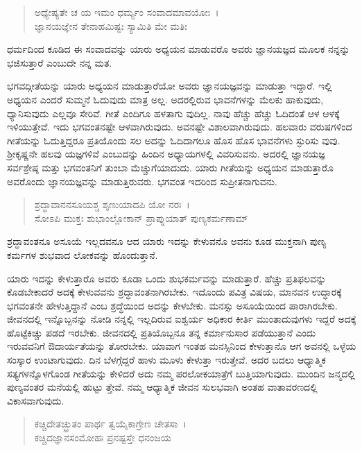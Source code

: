 \begin{verse}
ಅಧ್ಯೇಷ್ಯತೇ ಚ ಯ ಇಮಂ ಧರ್ಮ್ಯಂ ಸಂವಾದಮಾವಯೋಃ~।\\ಜ್ಞಾನಯಜ್ಞೇನ ತೇನಾಹಮಿಷ್ಟಃ ಸ್ಯಾಮಿತಿ ಮೇ ಮತಿಃ 
\end{verse}

{\small ಧರ್ಮದಿಂದ ಕೂಡಿದ ಈ ಸಂವಾದವನ್ನು ಯಾರು ಅಧ್ಯಯನ ಮಾಡುವರೊ ಅವರು ಜ್ಞಾನಯಜ್ಞದ ಮೂಲಕ ನನ್ನನ್ನು ಭಜಿಸುತ್ತಾರೆ ಎಂಬುದೇ ನನ್ನ ಮತ.}

ಭಗವದ್ಗೀತೆಯನ್ನು ಯಾರು ಅಧ್ಯಯನ ಮಾಡುತ್ತಾರೆಯೋ ಅವರು ಜ್ಞಾನಯಜ್ಞವನ್ನು ಮಾಡುತ್ತಾ ಇದ್ದಾರೆ. ಇಲ್ಲಿ ಅಧ್ಯಯನ ಎಂದರೆ ಸುಮ್ಮನೆ ಓದುವುದು ಮಾತ್ರ ಅಲ್ಲ. ಅದರಲ್ಲಿರುವ ಭಾವನೆಗಳನ್ನು ಮೆಲಕು ಹಾಕುವುದು, ಧ್ಯಾನಿಸುವುದು ಎಲ್ಲವೂ ಸೇರಿವೆ. ಗೀತೆ ಎಂದಿಗೂ ಹಳತಾಗು ವುದಿಲ್ಲ. ನಾವು ಹೆಚ್ಚು ಹೆಚ್ಚು ಓದಿದಂತೆ ಆಳ ಆಳಕ್ಕೆ ಇಳಿಯುತ್ತೇವೆ. ಇದು ಭಗವಂತನಷ್ಟೇ ಆಳವಾಗಿರುವುದು. ಅವನಷ್ಟೇ ವಿಶಾಲವಾಗಿರುವುದು. ಹಲವಾರು ವರುಷಗಳಿಂದ ಗೀತೆಯನ್ನು ಓದುತ್ತಿದ್ದರೂ ಪ್ರತಿಯೊಂದು ಸಲ ಅದನ್ನು ಓದಿದಾಗಲೂ ಹೊಸ ಹೊಸ ಭಾವನೆಗಳು ಸ್ಫುರಿಸು ವುವು. ಶ‍್ರೀಕೃಷ್ಣನೇ ಹಲವು ಯಜ್ಞಗಳಿವೆ ಎಂಬುದನ್ನು ಹಿಂದಿನ ಅಧ್ಯಾಯಗಳಲ್ಲಿ ವಿವರಿಸುವನು. ಅದರಲ್ಲಿ ಜ್ಞಾನಯಜ್ಞ ಸರ್ವಶ್ರೇಷ್ಠ ಮತ್ತು ಭಗವಂತನಿಗೆ ತುಂಬಾ ಮೆಚ್ಚುಗೆಯಾದುದು. ಯಾರು ಗೀತೆಯನ್ನು ಅಧ್ಯಯನ ಮಾಡುತ್ತಾರೊ ಅವರೊಂದು ಜ್ಞಾನಯಜ್ಞವನ್ನು ಮಾಡುತ್ತಿರುವರು. ಭಗವಂತ ಇದರಿಂದ ಸುಪ್ರೀತನಾಗುವನು.

\begin{verse}
ಶ್ರದ್ಧಾವಾನನಸೂಯಶ್ಚ ಶೃಣುಯಾದಪಿ ಯೋ ನರಃ~।\\ಸೋಽಪಿ ಮುಕ್ತಃ ಶುಭಾಂಲ್ಲೋಕಾನ್ ಪ್ರಾಪ್ನುಯಾತ್ ಪುಣ್ಯಕರ್ಮಣಾಮ್ 
\end{verse}

{\small ಶ್ರದ್ಧಾವಂತನೂ ಅಸೂಯೆ ಇಲ್ಲದವನೂ ಆದ ಯಾರು ಇದನ್ನು ಕೇಳುವನೊ ಅವನು ಕೂಡ ಮುಕ್ತನಾಗಿ ಪುಣ್ಯ ಕರ್ಮಗಳ ಶುಭವಾದ ಲೋಕವನ್ನು ಹೊಂದುತ್ತಾನೆ.}

ಯಾರು ಇದನ್ನು ಕೇಳುತ್ತಾರೊ ಅವರು ಕೂಡಾ ಒಂದು ಶುಭಕರ್ಮವನ್ನು ಮಾಡುತ್ತಾರೆ. ಹೆಚ್ಚು ಪ್ರತಿಫಲವನ್ನು ಕೊಡಬೇಕಾದರೆ ಅದಕ್ಕೆ ಕೇಳುವವನು ಶ್ರದ್ಧಾವಂತನಾಗಿರಬೇಕು. ಇದೊಂದು ಪವಿತ್ರ ವಿಷಯ, ಮಾನವನ ಉದ್ಧಾರಕ್ಕೆ ಭಗವಂತನೇ ಹೇಳುತ್ತಿದ್ದಾನೆ ಎಂಬ ಶ್ರದ್ಧೆಯಿಂದ ಅದನ್ನು ಕೇಳಬೇಕು. ಮನಸ್ಸು ಅಸೂಯೆಯಿಂದ ಪಾರಾಗಿರಬೇಕು. ಜೀವನದಲ್ಲಿ ಇನ್ನೊಬ್ಬನನ್ನು ನೋಡಿ ನನ್ನಲ್ಲಿ ಇಲ್ಲದಿರುವ ಐಶ್ವರ್ಯ ಅಧಿಕಾರ ಕೀರ್ತಿ ಮುಂತಾದುವುಗಳು ಇದ್ದರೆ ಅದಕ್ಕೆ ಹೊಟ್ಟೆಕಿಚ್ಚು ಪಡದೆ ಇರಬೇಕು. ಜೀವನದಲ್ಲಿ ಪ್ರತಿಯೊಬ್ಬನೂ ತನ್ನ ಕರ್ಮಾನುಸಾರ ಪಡೆಯುತ್ತಾನೆ ಎಂದು ಇರುವವನಿಗೆ ಔದಾರ್ಯತೆಯನ್ನು ತೋರಬೇಕು. ಯಾವಾಗ ಇಂತಹ ಮನಸ್ಸಿನಿಂದ ಕೇಳುತ್ತಾನೊ ಆಗ ಅವನಲ್ಲಿ ಒಳ್ಳೆಯ ಸಂಸ್ಕಾರ ಉಂಟಾಗುವುದು. ದಿನ ಬೆಳಗ್ಗೆದ್ದರೆ ಹಾಳು ಮೂಳು ಕೇಳುತ್ತಾ ಇರುತ್ತೇವೆ. ಅದರ ಬದಲು ಆಧ್ಯಾತ್ಮಿಕ ಸತ್ಯಗಳನ್ನೊಳಗೊಂಡ ಗೀತೆಯನ್ನು ಕೇಳಿದರೆ ಅದು ನಮ್ಮ ಪರಲೋಕಯಾತ್ರೆಗೆ ಬುತ್ತಿಯಾಗುವುದು. ಮುಂದಿನ ಜನ್ಮದಲ್ಲಿ ಪುಣ್ಯವಂತರ ಮನೆಯಲ್ಲಿ ಹುಟ್ಟು ತ್ತೇವೆ. ನಮ್ಮ ಆಧ್ಯಾತ್ಮಿಕ ಜೀವನ ಸುಲಭವಾಗಿ ಅಂತಹ ವಾತಾವರಣದಲ್ಲಿ ವಿಕಾಸವಾಗುವುದು.

\begin{verse}
ಕಚ್ಚಿದೇತಚ್ಛ್ರುತಂ ಪಾರ್ಥ ತ್ವಯೈಕಾಗ್ರೇಣ ಚೇತಸಾ~।\\ಕಚ್ಚಿದಜ್ಞಾನಸಂಮೋಹಃ ಪ್ರನಷ್ಟಸ್ತೇ ಧನಂಜಯ 
\end{verse}

